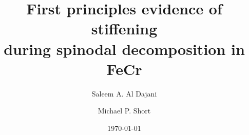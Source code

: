 \documentclass[final,3p,times]{elsarticle}
\providecommand{\DIFaddbegin}{} %
\providecommand{\DIFaddend}{} %
\providecommand{\DIFdelbegin}{} %
\providecommand{\DIFdelend}{} %
\providecommand{\DIFscaledelfig}{0.5}
\newlength{\DIFdelgraphicswidth} %
\newlength{\DIFdelgraphicsheight} %
\providecommand{\DIFaddincludegraphics}[2][]{{\color{blue}\fbox{\DIFOincludegraphics[#1]{#2}}}} %
\providecommand{\DIFdelincludegraphics}[2][]{%
\sbox{\DIFdelgraphicsbox}{\DIFOincludegraphics[#1]{#2}}%
\settoboxwidth{\DIFdelgraphicswidth}{\DIFdelgraphicsbox} %
\settoboxtotalheight{\DIFdelgraphicsheight}{\DIFdelgraphicsbox} %
\scalebox{\DIFscaledelfig}{%
\parbox[b]{\DIFdelgraphicswidth}{\usebox{\DIFdelgraphicsbox}\\[-\baselineskip] \rule{\DIFdelgraphicswidth}{0em}}\llap{\resizebox{\DIFdelgraphicswidth}{\DIFdelgraphicsheight}{%
\setlength{\unitlength}{\DIFdelgraphicswidth}%
\begin{picture}(1,1)%
\thicklines\linethickness{2pt} %
{\color[rgb]{1,0,0}\put(0,0){\framebox(1,1){}}}%
{\color[rgb]{1,0,0}\put(0,0){\line( 1,1){1}}}%
{\color[rgb]{1,0,0}\put(0,1){\line(1,-1){1}}}%
\end{picture}%
}\hspace*{3pt}}} %
} %
\DeclareRobustCommand{\DIFaddbegin}{\DIFOaddbegin \let\includegraphics\DIFaddincludegraphics} %
\DeclareRobustCommand{\DIFaddend}{\DIFOaddend \let\includegraphics\DIFOincludegraphics} %
\DeclareRobustCommand{\DIFdelbegin}{\DIFOdelbegin \let\includegraphics\DIFdelincludegraphics} %
\DeclareRobustCommand{\DIFdelend}{\DIFOaddend \let\includegraphics\DIFOincludegraphics} %
\begin{document}
\begin{frontmatter}

\DIFdelbegin %

\DIFdelend \title
{
\textbf
{
First principles evidence of stiffening \\ during spinodal decomposition in FeCr
}
}

\date
{\today}
\rhead{\today}

\DIFdelbegin %

\DIFdelend \author[1]{Saleem A. Al Dajani}
\author[1]{Michael P. Short}

\address{
Department of Nuclear Science and Engineering \\
Massachusetts Institute of Technology\\
77 Massachusetts Avenue \\
Cambridge, MA 02139}

\address[1]
{
Corresponding Author: \href{mailto:sdajani@mit.edu}{\texttt{sdajani@mit.edu}}
}
\DIFaddbegin 

\DIFaddend \begin{abstract}


\end{abstract}
\end{frontmatter}
\end{document}
